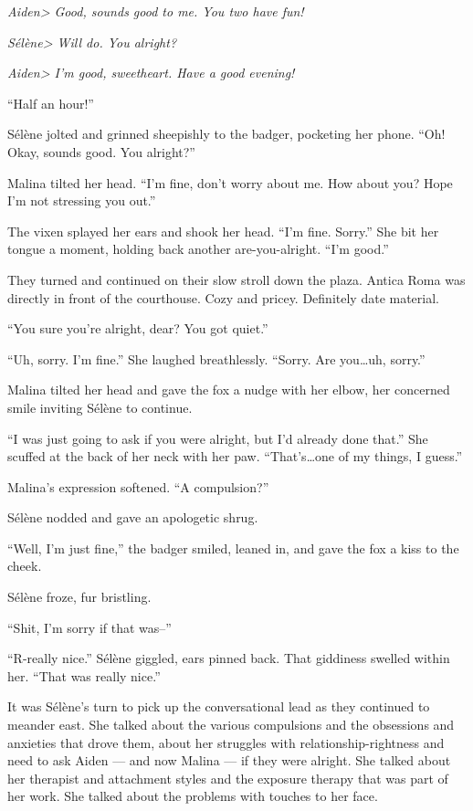 \emph{Aiden\textgreater{} Good, sounds good to me. You two have fun!}

\emph{Sélène\textgreater{} Will do. You alright?}

\emph{Aiden\textgreater{} I'm good, sweetheart. Have a good evening!}

``Half an hour!''

Sélène jolted and grinned sheepishly to the badger, pocketing her phone. ``Oh! Okay, sounds good. You alright?''

Malina tilted her head. ``I'm fine, don't worry about me. How about you? Hope I'm not stressing you out.''

The vixen splayed her ears and shook her head. ``I'm fine. Sorry.'' She bit her tongue a moment, holding back another are-you-alright. ``I'm good.''

They turned and continued on their slow stroll down the plaza. Antica Roma was directly in front of the courthouse. Cozy and pricey. Definitely date material.

``You sure you're alright, dear? You got quiet.''

``Uh, sorry. I'm fine.'' She laughed breathlessly. ``Sorry. Are you\ldots{}uh, sorry.''

Malina tilted her head and gave the fox a nudge with her elbow, her concerned smile inviting Sélène to continue.

``I was just going to ask if you were alright, but I'd already done that.'' She scuffed at the back of her neck with her paw. ``That's\ldots{}one of my things, I guess.''

Malina's expression softened. ``A compulsion?''

Sélène nodded and gave an apologetic shrug.

``Well, I'm just fine,'' the badger smiled, leaned in, and gave the fox a kiss to the cheek.

Sélène froze, fur bristling.

``Shit, I'm sorry if that was--''

``R-really nice.'' Sélène giggled, ears pinned back. That giddiness swelled within her. ``That was really nice.''

It was Sélène's turn to pick up the conversational lead as they continued to meander east. She talked about the various compulsions and the obsessions and anxieties that drove them, about her struggles with relationship-rightness and need to ask Aiden --- and now Malina --- if they were alright. She talked about her therapist and attachment styles and the exposure therapy that was part of her work. She talked about the problems with touches to her face.

